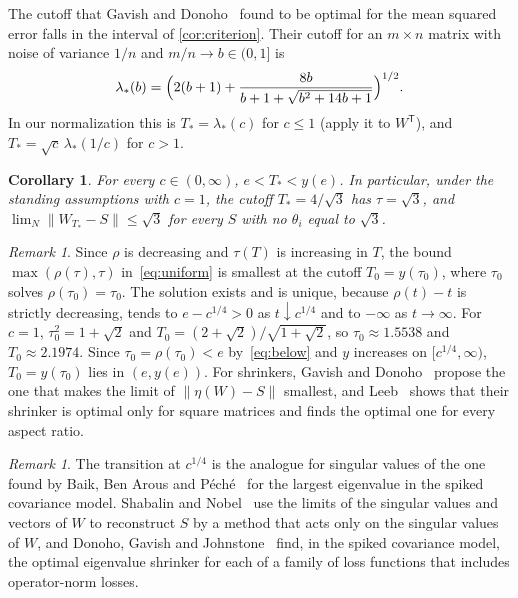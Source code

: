 \documentclass[11pt]{amsart}
\newtheorem{cor}[thm]{Corollary}
\theoremstyle{remark}
\newtheorem{rem}[thm]{Remark}
\numberwithin{equation}{section}
\begin{document}
The cutoff that Gavish and Donoho~\cite{GDhard} found to be optimal for the mean squared error falls in the interval of \cref{cor:criterion}. Their cutoff for an $m\times n$ matrix with noise of variance $1/n$ and $m/n\to b\in(0,1]$ is~\cite[(11)]{GDhard}
\[
\lambda_*(b)=\Bigl(2(b+1)+\frac{8b}{b+1+\sqrt{b^2+14b+1}}\Bigr)^{1/2}.
\]
In our normalization this is $T_*=\lambda_*(c)$ for $c\le1$ (apply it to $W^{\mathsf T}$), and $T_*=\sqrt c\,\lambda_*(1/c)$ for $c>1$.

\begin{cor}\label{cor:gd}
For every $c\in(0,\infty)$, $e<T_*<y(e)$. In particular, under the standing assumptions with $c=1$, the cutoff $T_*=4/\sqrt3$ has $\tau=\sqrt3$, and $\lim_N\|W_{T_*}-S\|\le\sqrt3$ for every $S$ with no $\theta_i$ equal to $\sqrt3$.
\end{cor}

\begin{rem}\label{rem:best}
Since $\rho$ is decreasing and $\tau(T)$ is increasing in $T$, the bound $\max(\rho(\tau),\tau)$ in~\eqref{eq:uniform} is smallest at the cutoff $T_0=y(\tau_0)$, where $\tau_0$ solves $\rho(\tau_0)=\tau_0$. The solution exists and is unique, because $\rho(t)-t$ is strictly decreasing, tends to $e-c^{1/4}>0$ as $t\downarrow c^{1/4}$ and to $-\infty$ as $t\to\infty$. For $c=1$, $\tau_0^2=1+\sqrt2$ and $T_0=(2+\sqrt2)/\sqrt{1+\sqrt2}$, so $\tau_0\approx1.5538$ and $T_0\approx2.1974$. Since $\tau_0=\rho(\tau_0)<e$ by~\eqref{eq:below} and $y$ increases on $[c^{1/4},\infty)$, $T_0=y(\tau_0)$ lies in $(e,y(e))$. For shrinkers, Gavish and Donoho~\cite[Section~6.2]{GD} propose the one that makes the limit of $\|\eta(W)-S\|$ smallest, and Leeb~\cite{Leeb} shows that their shrinker is optimal only for square matrices and finds the optimal one for every aspect ratio.
\end{rem}

\begin{rem}\label{rem:context}
The transition at $c^{1/4}$ is the analogue for singular values of the one found by Baik, Ben Arous and P\'ech\'e~\cite{BBP} for the largest eigenvalue in the spiked covariance model. Shabalin and Nobel~\cite{SN} use the limits of the singular values and vectors of $W$ to reconstruct $S$ by a method that acts only on the singular values of $W$, and Donoho, Gavish and Johnstone~\cite{DGJ} find, in the spiked covariance model, the optimal eigenvalue shrinker for each of a family of loss functions that includes operator-norm losses.
\end{rem}
\end{document}
